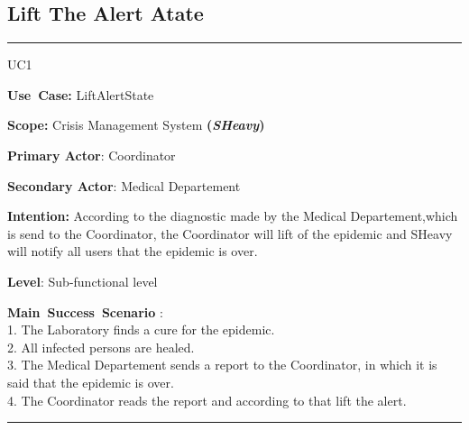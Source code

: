 \subsection{Lift The Alert Atate}
\vspace{0.5cm}
\hrule
\vspace{0.5cm}
\begin{lyxlist}{UC1}
\small{
\item [\textbf{Use~Case:}] LiftAlertState
\item [\textbf{Scope:}] Crisis Management System \textbf{(\emph{SHeavy})}
\item [\textbf{Primary Actor}:] Coordinator
\item [\textbf{Secondary Actor}:] Medical Departement
\item [\textbf{Intention:}] According to the diagnostic made by the Medical
Departement,which is send to the Coordinator, the Coordinator
will lift of the epidemic and SHeavy will notify all users that the epidemic is
over.
\item [\textbf{Level}:]Sub-functional level
\item [\textbf{Main~Success~Scenario}]:\\
1. The Laboratory finds a cure for the epidemic.\\
2. All infected persons are healed.\\
3. The Medical Departement sends a report to the Coordinator, in which it is
said that the epidemic is over.\\
4. The Coordinator reads the report and according to that lift the alert.\\ 
}
\end{lyxlist}
\hrule
\vspace{0.5cm} 

